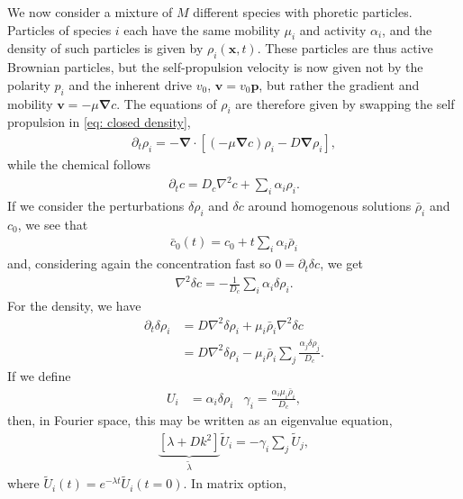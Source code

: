 We now consider a mixture of $M$ different species with phoretic particles.
Particles of species $i$ each have the same mobility $\mu_i$ and activity $\alpha_i$, and the density of such particles is given by $\rho_i(\bm x, t)$.
These particles are thus active Brownian particles, but the self-propulsion velocity is now given not by the polarity $p_i$ and the inherent drive $v_0$, $\bm v = v_0 \bm p$, but rather the gradient and mobility $\bm v = - \mu \bm \nabla c$.
The equations of $\rho_i$ are therefore given by swapping the self propulsion in \autoref{eq: closed density},
%
\begin{align}
    \partial_t \rho_i 
    = - \bm \nabla \cdot \left[ (- \mu \bm \nabla c) \rho_i - D \bm \nabla \rho_i \right],
\end{align}
%
while the chemical follows
%
\begin{align}
    \partial_t c = D_c \nabla^2 c + \sum_i \alpha_i \rho_i.
\end{align}
%
If we consider the perturbations $\delta \rho_i$ and $\delta c$ around homogenous solutions $\bar \rho_i$ and $c_0$, we see that
%
\begin{align}
    \bar c_0(t) = c_0 + t \sum_i \alpha_i \bar \rho_i
\end{align}
%
and, considering again the concentration fast so $0 = \partial_t\delta c$, we get
%
\begin{align}
    \nabla^2 \delta c = - \frac{1}{D_c} \sum_i \alpha_i \delta \rho_i.
\end{align}
%
For the density, we have
%
\begin{align}
    \partial_t \delta \rho_i 
    &= D \nabla^2 \delta \rho_i + \mu_i \bar \rho_i \nabla^2 \delta c\\
    & = D \nabla^2\delta \rho_i 
    - \mu_i \bar \rho_i \sum_j \frac{\alpha_j \delta \rho_j}{D_c}.
\end{align}
%
If we define
%
\begin{align}
    U_i &= \alpha_i \delta \rho_i & 
    \gamma_i = \frac{\alpha_i \mu_i \bar \rho_i}{D_c},
\end{align}
%
then, in Fourier space, this may be written as an eigenvalue equation,
%
\begin{align}
    \underbrace{\left[ \lambda + Dk^2 \right]}_{\tilde \lambda} \tilde U_i =
    - \gamma_i \sum_j \tilde U_j,
\end{align}
%
where $\tilde U_i(t) = e^{- \lambda t} \tilde U_i(t = 0)$.
In matrix option,
%
